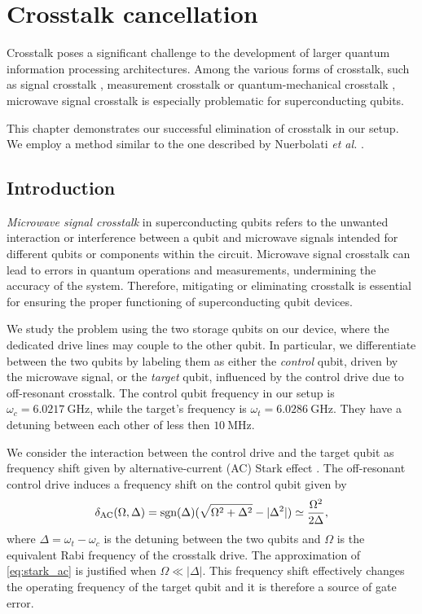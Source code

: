 \chapter{Crosstalk cancellation}
\label{chap:crosstalk}

Crosstalk poses a significant challenge to the development of larger quantum information processing architectures.
Among the various forms of crosstalk, such as signal crosstalk \cite{signal_crosstalk}, measurement crosstalk \cite{meas_crosstalk} or quantum-mechanical crosstalk \cite{QM_crosstalk}, microwave signal crosstalk is especially problematic for superconducting qubits.

This chapter demonstrates our successful elimination of crosstalk in our setup. 
We employ a method similar to the one described by Nuerbolati \emph{et al.} \cite{crosstalk}.

\section{Introduction}

\emph{Microwave signal crosstalk} in superconducting qubits refers to the unwanted interaction or interference between a qubit and microwave signals intended for different qubits or components within the circuit.
Microwave signal crosstalk can lead to errors in quantum operations and measurements, undermining the accuracy of the system. 
Therefore, mitigating or eliminating crosstalk is essential for ensuring the proper functioning of superconducting qubit devices.

We study the problem using the two storage qubits on our device, where the dedicated drive lines may couple to the other qubit.
In particular, we differentiate between the two qubits by labeling them as either the \emph{control} qubit, driven by the microwave signal, or the \emph{target} qubit, influenced by the control drive due to off-resonant crosstalk.
The control qubit frequency in our setup is $\omega_c = \SI{6.0217}{\giga \hertz}$, while the target's frequency is $\omega_t = \SI{6.0286}{\giga \hertz}$.
They have a detuning between each other of less then $\SI{10}{\mega \hertz}$.

We consider the interaction between the control drive and the target qubit as frequency shift given by alternative-current (AC) Stark effect \cite{AC_starl}.
The off-resonant control drive induces a frequency shift on the control qubit given by
\begin{equation}
\label{eq:stark_ac}
    \delta_{\text{AC}} (\Omega, \Delta) = 
    \text{sgn} (\Delta) ( \sqrt{\Omega^2 + \Delta^2} - |\Delta^2|) 
    \simeq \frac{\Omega^2}{2 \Delta} ,
\end{equation}
where $\Delta = \omega_t - \omega_c$ is the detuning between the two qubits and $\Omega$ is the equivalent Rabi frequency of the crosstalk drive.
The approximation of \cref{eq:stark_ac} is justified when $\Omega \ll |\Delta|$.
This frequency shift effectively changes the operating frequency of the target qubit and it is therefore a source of gate error.

